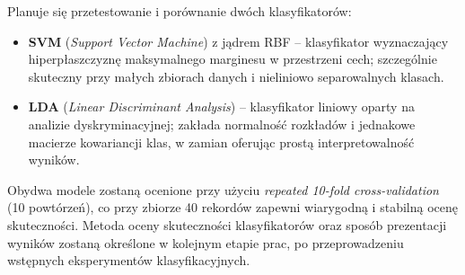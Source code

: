 \documentclass[a4paper,12pt]{article}
\begin{document}
Planuje się przetestowanie i porównanie dwóch klasyfikatorów:

\begin{itemize}
    \item \textbf{SVM} (\textit{Support Vector Machine}) z jądrem RBF -- klasyfikator wyznaczający hiperpłaszczyznę maksymalnego marginesu w przestrzeni cech; szczególnie skuteczny przy małych zbiorach danych i nieliniowo separowalnych klasach.
    \item \textbf{LDA} (\textit{Linear Discriminant Analysis}) -- klasyfikator liniowy oparty na analizie dyskryminacyjnej; zakłada normalność rozkładów i jednakowe macierze kowariancji klas, w zamian oferując prostą interpretowalność wyników.
\end{itemize}

Obydwa modele zostaną ocenione przy użyciu \textit{repeated 10-fold cross-validation} (10 powtórzeń), co przy zbiorze 40 rekordów zapewni wiarygodną i stabilną ocenę skuteczności. 
Metoda oceny skuteczności klasyfikatorów oraz sposób prezentacji wyników zostaną określone w kolejnym etapie prac, po przeprowadzeniu wstępnych eksperymentów klasyfikacyjnych.
\end{document}
